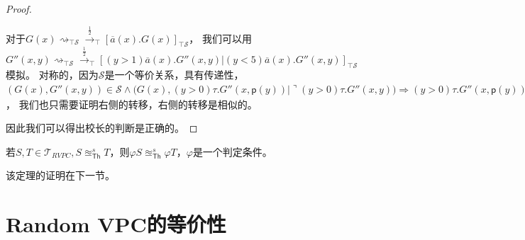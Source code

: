 \begin{proof}
\begin{itemize}
{         对于$G(x)\rightsquigarrow_{\top\mathcal{S}}\stackrel{\frac{1}{2}}{\rightarrow}_{\top} [\overline{a}(x).G(x)]_{\top\mathcal{S}}$，
         我们可以用$G''(x,y)\rightsquigarrow_{\top\mathcal{S}}\stackrel{\frac{1}{2}}{\rightarrow}_{\top}[(y>1)\overline{a}(x).G''(x,y)|(y<5)\overline{a}(x).G''(x,y)]_{\top\mathcal{S}}$模拟。
         对称的，因为$\mathcal{S}$是一个等价关系，具有传递性，$(G(x),G''(x,y))\in\mathcal{S}\wedge (G(x),(y>0)\tau.G''(x,\mathsf{p}(y))|\urcorner (y>0)\tau.G''(x,y))\Rightarrow (y>0)\tau.G''(x,\mathsf{p}(y))|\urcorner (y>0)\tau.G''(x,y)\in [G(x)]_{\top\mathcal{S}}$，
         我们也只需要证明右侧的转移，右侧的转移是相似的。
      }
   \end{itemize}
   因此我们可以得出校长的判断是正确的。
\end{proof}

\begin{theorem}
   若$S,T\in \mathcal{T}_{RVPC},S\approxeq^s_{\mathsf{Th}} T$，则$\varphi S \approxeq^s_{\mathsf{Th}} \varphi T$，$\varphi$是一个判定条件。
\end{theorem}
该定理的证明在下一节。

\section{Random VPC的等价性}

